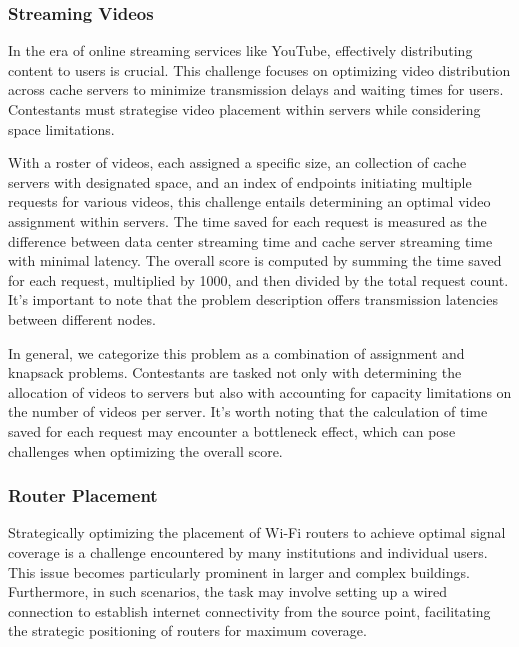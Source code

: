 \subsubsection*{Streaming Videos}
\label{subsubsec:hashcode-2017-qualification}

In the era of online streaming services like YouTube, effectively distributing
content to users is crucial. This challenge focuses on optimizing video
distribution across cache servers to minimize transmission delays and waiting
times for users. Contestants must strategise video placement within servers
while considering space limitations.

With a roster of videos, each assigned a specific size, an collection of cache
servers with designated space, and an index of endpoints initiating multiple
requests for various videos, this challenge entails determining an optimal
video assignment within servers. The time saved for each request is measured as the
difference between data center streaming time and cache server streaming time
with minimal latency. The overall score is computed by summing the time saved
for each request, multiplied by 1000, and then divided by the total request
count. It's important to note that the problem description offers transmission
latencies between different nodes.

In general, we categorize this problem as a combination of assignment and
knapsack problems. Contestants are tasked not only with determining the
allocation of videos to servers but also with accounting for capacity
limitations on the number of videos per server. It's worth noting that the
calculation of time saved for each request may encounter a bottleneck effect,
which can pose challenges when optimizing the overall score.

\subsubsection*{Router Placement}
\label{subsubsec:hashcode-2017-final}

Strategically optimizing the placement of Wi-Fi routers to achieve optimal
signal coverage is a challenge encountered by many institutions and individual
users. This issue becomes particularly prominent in larger and complex
buildings. Furthermore, in such scenarios, the task may involve setting up a wired
connection to establish internet connectivity from the source point,
facilitating the strategic positioning of routers for maximum coverage.


